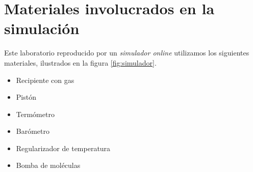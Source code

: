 \documentclass[../portafolio.tex]{subfiles}
\begin{document}
\section{Materiales involucrados en la simulación}
Este laboratorio reproducido por un \textit{simulador online} utilizamos los siguientes materiales, ilustrados en la figura \ref{fig:simulador}.
\begin{itemize}
    \item Recipiente con gas
    \item Pistón
    \item Termómetro
    \item Barómetro
    \item Regularizador de temperatura
    \item Bomba de moléculas
\end{itemize}
\end{document}
